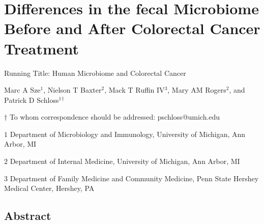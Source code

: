 \documentclass[12pt,]{article}
\title{}
\author{}
\date{}
\begin{document}
\section{Differences in the fecal Microbiome Before and After Colorectal
Cancer
Treatment}\label{differences-in-the-fecal-microbiome-before-and-after-colorectal-cancer-treatment}

\vspace{25mm}

\begin{center}
Running Title: Human Microbiome and Colorectal Cancer

\vspace{10mm}

Marc A Sze${^1}$, Nielson T Baxter${^2}$, Mack T Ruffin IV${^3}$, Mary AM Rogers${^2}$, and Patrick D Schloss${^1}$${^\dagger}$

\vspace{20mm}

$\dagger$ To whom correspondence should be addressed: pschloss@umich.edu

$1$ Department of Microbiology and Immunology, University of Michigan, Ann Arbor, MI

$2$ Department of Internal Medicine, University of Michigan, Ann Arbor, MI   

$3$ Department of Family Medicine and Community Medicine, Penn State Hershey Medical Center, Hershey, PA    


\end{center}

\newpage

\linenumbers

\subsection{Abstract}\label{abstract}
\end{document}
